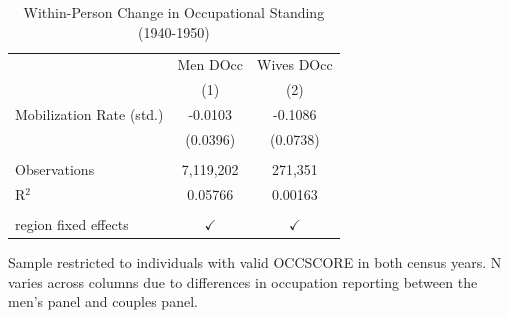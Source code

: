 
\begin{table}[htbp]
   \caption{\label{tab:occupation} Within-Person Change in Occupational Standing (1940-1950)}
   \bigskip
   \centering
   \begin{tabular}{lcc}
      \toprule
                               & Men DOcc      & Wives DOcc \\   
                               & (1)           & (2)\\  
      \midrule 
      Mobilization Rate (std.) & -0.0103       & -0.1086\\   
                               & (0.0396)      & (0.0738)\\   
       \\
      Observations             & 7,119,202     & 271,351\\  
      R$^2$                    & 0.05766       & 0.00163\\  
       \\
      region fixed effects     & $\checkmark$  & $\checkmark$\\   
      \bottomrule
   \end{tabular}
   
   \par \raggedright 
   Sample restricted to individuals with valid OCCSCORE in both census years. N varies across columns due to differences in occupation reporting between the men's panel and couples panel.
\end{table}


